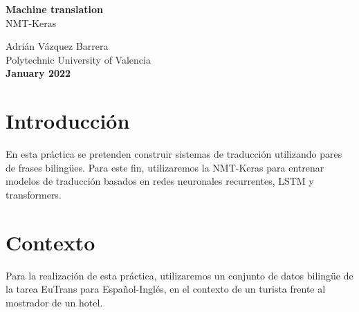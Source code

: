 \documentclass[12pt]{article}
\begin{document}
\begin{titlepage}
    \begin{center}
        \vspace*{1cm}
         \textbf{\huge Machine translation} \\        
        \vspace{0.25cm}
         {\LARGE NMT-Keras }\\
 
        \vfill
        
        

        Adrián Vázquez Barrera \\
        \vspace{0.25cm}
        Polytechnic University of Valencia\\
        \vspace{0.25cm}
        \textbf{January 2022}
             
    \end{center}
 \end{titlepage}

\newpage

\section*{Introducción}
En esta práctica se pretenden construir sistemas de traducción utilizando pares de 
frases bilingües.  Para este fin, utilizaremos la NMT-Keras 
para entrenar modelos de traducción basados en redes neuronales recurrentes, LSTM y transformers.

\section*{Contexto}
Para la realización de esta práctica, utilizaremos un conjunto de datos bilingüe de la tarea EuTrans para Español-Inglés, en el contexto de un turista frente al mostrador de un hotel.

\newpage
\end{document}
